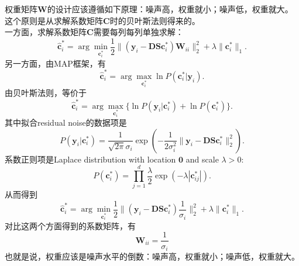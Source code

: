 \documentclass[10pt,twocolumn,letterpaper]{article}
\begin{document}
权重矩阵$\mathbf{W}$的设计应该遵循如下原理：噪声高，权重就小；噪声低，权重就大。这个原则是从求解系数矩阵$\mathbf{C}$时的贝叶斯法则得来的。
\\
一方面，求解系数矩阵$\mathbf{C}$需要每列每列单独求解：
\begin{equation}
\hat{\mathbf{c}}_{i}^{*}
=
\arg\min_{\mathbf{c}_{i}^{*}}\frac{1}{2}\|(\mathbf{y}_{i}-\mathbf{D}\mathbf{S}\mathbf{c}_{i}^{*})\mathbf{W}_{ii}\|_{2}^{2}
+
\lambda\|\mathbf{c}_{i}^{*}\|_{1}.
\end{equation}
另一方面，由MAP框架，有
\begin{equation}
\hat{\mathbf{c}}_{i}^{*} = \arg\max_{\mathbf{c}_{i}^{*}}\ln P(\mathbf{c}_{i}^{*}|\mathbf{y}_{i}).
\end{equation}
由贝叶斯法则，等价于
\begin{equation}
\hat{\mathbf{c}}_{i}^{*} = \arg\max_{\mathbf{c}_{i}^{*}}\{\ln P(\mathbf{y}_{i}|\mathbf{c}_{i}^{*})+\ln P(\mathbf{c}_{i}^{*})\}.
\end{equation}
其中拟合residual noise的数据项是
\begin{equation}
P(\mathbf{y}_{i}|\mathbf{c}_{i}^{*}) = \frac{1}{\sqrt{2\pi}\sigma_{i}}\exp(-\frac{1}{2\sigma_{i}^{2}}\|\mathbf{y}_{i}-\mathbf{D}\mathbf{S}\mathbf{c}_{i}^{*}\|_{2}^{2}).
\end{equation}
系数正则项是Laplace distribution with location $\mathbf{0}$ and scale $\lambda>0$:
\begin{equation}
P(\mathbf{c}_{i}^{*})=\prod_{j=1}^{d}\frac{\lambda}{2}\exp(-\lambda|\mathbf{c}_{ij}^{*}|).
\end{equation}
从而得到
\begin{equation}
\hat{\mathbf{c}}_{i}^{*}=\arg\min_{\mathbf{c}_{i}^{*}}\frac{1}{2}\|(\mathbf{y}_{i}-\mathbf{D}\mathbf{S}\mathbf{c}_{i}^{*})\frac{1}{\sigma_{i}}\|_{2}^{2}+\lambda\|\mathbf{c}_{i}^{*}\|_{1}.
\end{equation}
对比这两个方面得到的系数矩阵，有
\begin{equation}
\mathbf{W}_{ii} = \frac{1}{\sigma_{i}}
\end{equation}
也就是说，权重应该是噪声水平的倒数：噪声高，权重就小；噪声低，权重就大。
\end{document}
